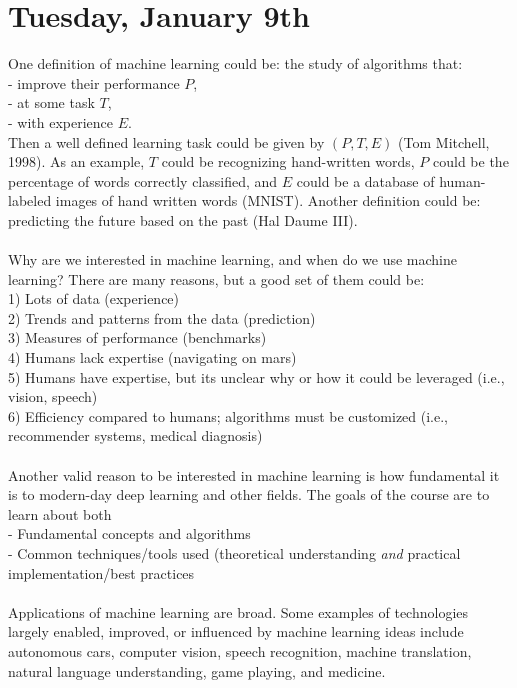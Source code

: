 \documentclass[11 pt]{scrartcl}
\begin{document}
\section{Tuesday, January 9th}
One definition of machine learning could be: the study of algorithms that: \\
- improve their performance $P$, \\
- at some task $T$, \\
- with experience $E$. \\
Then a well defined learning task could be given by $(P, T, E)$ (Tom Mitchell, 1998). As an example, $T$ could be recognizing hand-written words, $P$ could be the percentage of words correctly classified, and $E$ could be a database of human-labeled images of hand written words (MNIST). Another definition could be: predicting the future based on the past (Hal Daume III). \\\\
Why are we interested in machine learning, and when do we use machine learning? There are many reasons, but a good set of them could be: \\
1) Lots of data (experience) \\
2) Trends and patterns from the data (prediction) \\
3) Measures of performance (benchmarks) \\
4) Humans lack expertise (navigating on mars) \\
5) Humans have expertise, but its unclear why or how it could be leveraged (i.e., vision, speech) \\
6) Efficiency compared to humans; algorithms must be customized (i.e., recommender systems, medical diagnosis) \\\\
Another valid reason to be interested in machine learning is how fundamental it is to modern-day deep learning and other fields. The goals of the course are to learn about both \\
- Fundamental concepts and algorithms \\
- Common techniques/tools used (theoretical understanding \textit{and} practical implementation/best practices \\\\
Applications of machine learning are broad. Some examples of technologies largely enabled, improved, or influenced by machine learning ideas include autonomous cars, computer vision, speech recognition, machine translation, natural language understanding, game playing, and medicine. 
\end{document}
